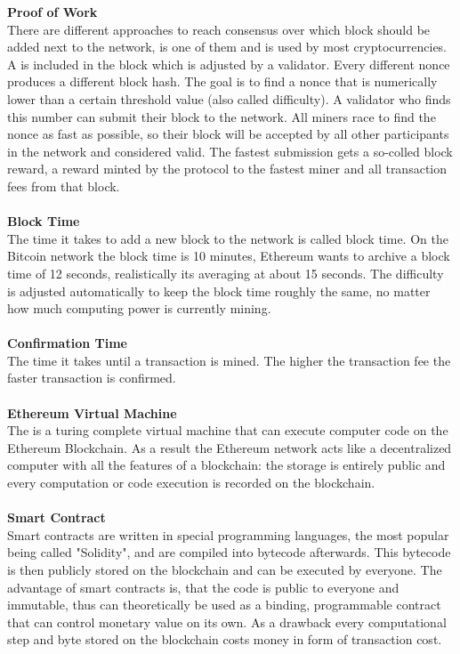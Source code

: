 \textbf{Proof of Work}\\
There are different approaches to reach consensus over which block should be added next to the network,  is one of them and is used by most cryptocurrencies. A  is included in the block which is adjusted by a validator. Every different nonce produces a different block hash. The goal is to find a nonce that is numerically lower than a certain threshold value (also called difficulty). A validator who finds this number can submit their block to the network. All miners race to find the nonce as fast as possible, so their block will be accepted by all other participants in the network and considered valid. The fastest submission gets a so-colled block reward, a reward minted by the protocol to the fastest miner and all transaction fees from that block.
\\\\

\textbf{Block Time}\\
The time it takes to add a new block to the network is called block time. On the Bitcoin network the block time is 10 minutes\cite{bitcoin-whitepaper}, Ethereum wants to archive a block time of 12 seconds\cite{ethereum-blocktime}, realistically its averaging at about 15 seconds\cite{ethereum-blocktime-chart}. The difficulty is adjusted automatically to keep the block time roughly the same, no matter how much computing power is currently mining.
\\\\

\textbf{Confirmation Time}\\
The time it takes until a transaction is mined. The higher the transaction fee the faster transaction is confirmed.
\\\\

\textbf{Ethereum Virtual Machine}\\
The  is a turing complete virtual machine that can execute computer code on the Ethereum Blockchain. As a result the Ethereum network acts like a decentralized computer with all the features of a blockchain: the storage is entirely public and every computation or code execution is recorded on the blockchain.
\\\\

\textbf{Smart Contract}\\
Smart contracts are written in special programming languages, the most popular being called "Solidity", and are compiled into bytecode afterwards. This bytecode is then publicly stored on the blockchain and can be executed by everyone. The advantage of smart contracts is, that the code is public to everyone and immutable, thus can theoretically be used as a binding, programmable contract that can control monetary value on its own. As a drawback every computational step and byte stored on the blockchain costs money in form of transaction cost.
\\\\

